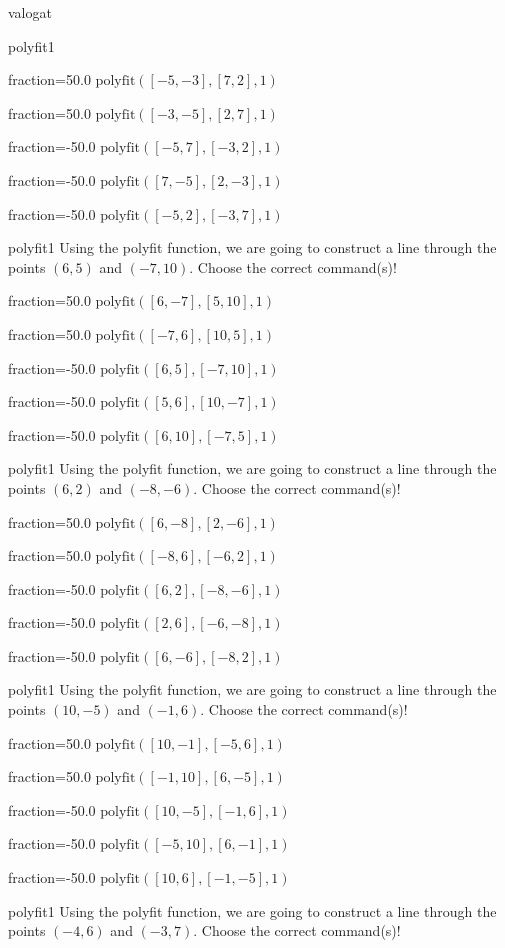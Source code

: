 \documentclass[12pt]{article}
\begin{document}
\begin{quiz}{valogat}
\begin{multi}[multiple]{polyfit1}
\item[fraction=50.0] $\mathrm{polyfit}([-5,-3], [7,2], 1)$
\item[fraction=50.0] $\mathrm{polyfit}([-3,-5], [2,7], 1)$
\item[fraction=-50.0]  $\mathrm{polyfit}([-5,7], [-3,2], 1)$
\item[fraction=-50.0]  $\mathrm{polyfit}([7,-5], [2,-3], 1)$
\item[fraction=-50.0]  $\mathrm{polyfit}([-5,2], [-3,7], 1)$
\end{multi}
\begin{multi}[multiple]{polyfit1}
Using the polyfit function, we are going to construct a line through the points $\left(6,5\right)$ and $\left(-7,10\right)$.
Choose the correct command(s)!

\item[fraction=50.0] $\mathrm{polyfit}([6,-7], [5,10], 1)$
\item[fraction=50.0] $\mathrm{polyfit}([-7,6], [10,5], 1)$
\item[fraction=-50.0]  $\mathrm{polyfit}([6,5], [-7,10], 1)$
\item[fraction=-50.0]  $\mathrm{polyfit}([5,6], [10,-7], 1)$
\item[fraction=-50.0]  $\mathrm{polyfit}([6,10], [-7,5], 1)$
\end{multi}
\begin{multi}[multiple]{polyfit1}
Using the polyfit function, we are going to construct a line through the points $\left(6,2\right)$ and $\left(-8,-6\right)$.
Choose the correct command(s)!

\item[fraction=50.0] $\mathrm{polyfit}([6,-8], [2,-6], 1)$
\item[fraction=50.0] $\mathrm{polyfit}([-8,6], [-6,2], 1)$
\item[fraction=-50.0]  $\mathrm{polyfit}([6,2], [-8,-6], 1)$
\item[fraction=-50.0]  $\mathrm{polyfit}([2,6], [-6,-8], 1)$
\item[fraction=-50.0]  $\mathrm{polyfit}([6,-6], [-8,2], 1)$
\end{multi}
\begin{multi}[multiple]{polyfit1}
Using the polyfit function, we are going to construct a line through the points $\left(10,-5\right)$ and $\left(-1,6\right)$.
Choose the correct command(s)!

\item[fraction=50.0] $\mathrm{polyfit}([10,-1], [-5,6], 1)$
\item[fraction=50.0] $\mathrm{polyfit}([-1,10], [6,-5], 1)$
\item[fraction=-50.0]  $\mathrm{polyfit}([10,-5], [-1,6], 1)$
\item[fraction=-50.0]  $\mathrm{polyfit}([-5,10], [6,-1], 1)$
\item[fraction=-50.0]  $\mathrm{polyfit}([10,6], [-1,-5], 1)$
\end{multi}
\begin{multi}[multiple]{polyfit1}
Using the polyfit function, we are going to construct a line through the points $\left(-4,6\right)$ and $\left(-3,7\right)$.
Choose the correct command(s)!


\end{multi}
\end{quiz}
\end{document}
